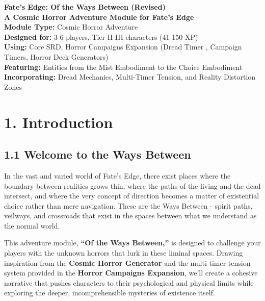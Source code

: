 \documentclass[11pt]{article}
\begin{document}


\begin{center}
{\LARGE \textbf{Fate's Edge: Of the Ways Between (Revised)}}\\[1em]
{\large \textbf{A Cosmic Horror Adventure Module for Fate's Edge}}\\[2em]

\textbf{Module Type:} Cosmic Horror Adventure\\
\textbf{Designed for:} 3-6 players, Tier II-III characters (41-150 XP)\\
\textbf{Using:} Core SRD, Horror Campaigns Expansion (Dread Timer , Campaign Timers, Horror Deck Generators)\\
\textbf{Featuring:} Entities from the Mist Embodiment to the Choice Embodiment\\
\textbf{Incorporating:} Dread Mechanics, Multi-Timer Tension, and Reality Distortion Zones
\end{center}

\clearpage

\tableofcontents

\clearpage

\section*{1. Introduction}

\subsection*{1.1 Welcome to the Ways Between}

In the vast and varied world of Fate's Edge, there exist places where the boundary between realities grows thin, where the paths of the living and the dead intersect, and where the very concept of direction becomes a matter of existential choice rather than mere navigation. These are the Ways Between - spirit paths, veilways, and crossroads that exist in the spaces between what we understand as the normal world.

This adventure module, \textbf{``Of the Ways Between,''} is designed to challenge your players with the unknown horrors that lurk in these liminal spaces. Drawing inspiration from the \textbf{Cosmic Horror Generator} and the multi-timer tension system provided in the \textbf{Horror Campaigns Expansion}, we'll create a cohesive narrative that pushes characters to their psychological and physical limits while exploring the deeper, incomprehensible mysteries of existence itself.
\end{document}
